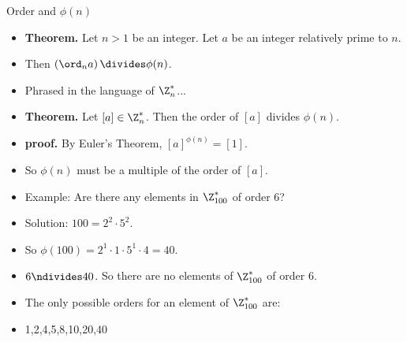 \documentclass[handout]{beamer}
\begin{document}
\begin{frame}{Order and $\phi(n)$}

\begin{itemize}
  \item \textbf{Theorem.} Let $n>1$ be an integer. Let $a$ be an integer relatively prime to $n$.
  \item Then $\left( \ord_n a \right) \divides \phi(n)$.
  \item Phrased in the language of $\Z_n^*$...
  \item \textbf{Theorem.} Let $[a]\in\Z_n^*$. Then the order of $[a]$ divides $\phi(n)$.
  \item \textbf{proof.} By Euler's Theorem, $[a]^{\phi(n)}=[1]$.
  \item So $\phi(n)$ must be a multiple of the order of $[a]$.
  \item Example: Are there any elements in $\Z_{100}^*$ of order 6?
  \item Solution: $100=2^2\cdot 5^2$.
  \item So $\phi(100) = 2^1\cdot 1 \cdot 5^1 \cdot  4 = 40$.
  \item $6\ndivides 40$. So there are no elements of $\Z_{100}^*$ of order 6.
  \item The only possible orders for an element of $\Z_{100}^*$ are:
  \item 1,2,4,5,8,10,20,40
\end{itemize}
\end{frame}
\end{document}
